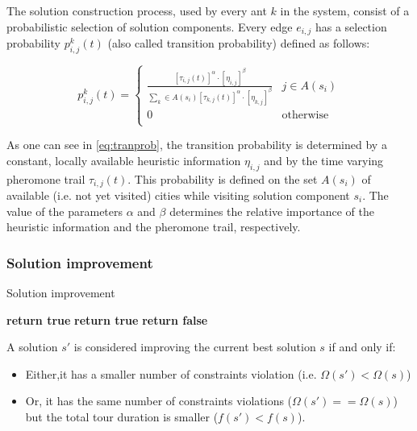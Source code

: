 \begin{homeworkProblem}
The solution construction process, used by every ant $k$ in the system, consist of a probabilistic selection of solution components.
Every edge $e_{i,j}$ has a selection probability $p_{i,j}^k(t)$ (also called transition probability) defined as follows:

\begin{equation} \label{eq:tranprob}
p_{i,j}^k(t) = \begin{cases}
  \frac{[\tau_{i,j}(t)]^\alpha \cdot [\eta_{i,j}]^\beta}{\sum_{k} \in A(s_{i}) [\tau_{k,j}(t)]^\alpha \cdot [\eta_{k,j}]^\beta} & j \in A(s_{i}) \\
 0 & \text{otherwise} \\
\end{cases}
\end{equation}

As one can see in \ref{eq:tranprob}, the transition probability is determined by a constant, locally available heuristic information $\eta_{i,j}$ and by the time varying pheromone trail $\tau_{i,j}(t)$.
This probability is defined on the set $A(s_i)$ of available (i.e. not yet visited) cities while visiting solution component $s_i$.
The value of the parameters $\alpha$ and $\beta$ determines the relative importance of the heuristic information and the pheromone trail, respectively.

\subsubsection{Solution improvement}
\begin{algorithm}[!h]
  \caption{Solution improvement}\label{solImprov}
  \begin{algorithmic}[1]
          \State \textbf{return true}
      \Else
            \State \textbf{return true}
           \EndIf
      \EndIf
      \State \textbf{return false}
      \EndProcedure
\end{algorithmic}
\end{algorithm}

A solution $s'$ is considered improving the current best solution $s$ if and only if:
\begin{itemize}
  \item Either,it has a smaller number of constraints violation (i.e. $\Omega(s') < \Omega(s)$)
  \item Or, it has the same number of constraints violations ($\Omega(s') == \Omega(s)$) but the total tour duration is smaller ($f(s') < f(s)$).
\end{itemize}



\end{homeworkProblem}
